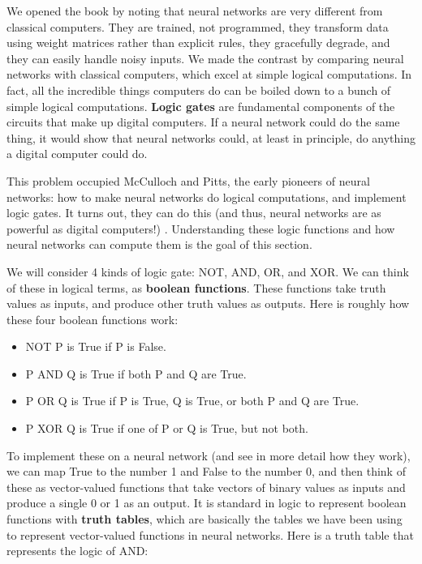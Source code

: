 
We opened the book by noting that neural networks are very different from classical computers. They are trained, not programmed, they transform data using weight matrices rather than explicit rules, they gracefully degrade, and they can easily handle noisy inputs. We made the contrast by comparing neural networks with classical computers, which excel at simple logical computations.  In fact, all the incredible things computers do can be boiled down to a bunch of simple logical computations. \textbf{Logic gates} are fundamental components of the circuits that make up digital computers. If a neural network could do the same thing, it would show that neural networks could, at least in principle, do anything a digital computer could do.

This problem occupied McCulloch and Pitts, the early pioneers of neural networks: how to make neural networks do logical computations, and implement logic gates. It turns out, they can do this  (and thus, neural networks are as powerful as digital computers!) \cite{mcculloch1943logical}. Understanding these logic functions and how neural networks can compute them is the goal of this section.

We will consider 4 kinds of logic gate: NOT, AND, OR, and XOR. We can think of these in logical terms, as \textbf{boolean functions}. These functions take truth values as inputs, and produce other truth values as outputs. Here is roughly how these four boolean functions work:

\begin{itemize}
\item NOT P is True if P is False.
\item P AND Q is True if both P and Q are True.
\item P OR Q is True if P is True, Q is True, or both P and Q are True.
\item P XOR Q is True if one of P or Q is True, but not both.
\end{itemize}

To implement these on a neural network (and see in more detail how they work), we  can map True to the number 1 and False to the number 0, and then think of these as vector-valued functions that take vectors of binary values as inputs and produce a single 0 or 1 as an output. It is standard in logic to represent boolean functions with \textbf{truth tables}, which are basically the tables we have been using to represent vector-valued functions in neural networks. Here is a truth table that represents the logic of AND:


